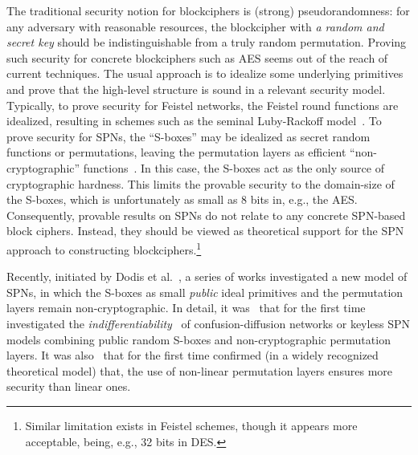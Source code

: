 


The traditional security notion for blockciphers is (strong) pseudorandomness: for any adversary with reasonable resources, the blockcipher with {\it a random and secret key} should be indistinguishable from a truly random
permutation. Proving such security for concrete blockciphers such as AES
seems out of the reach of current techniques. The usual approach is to idealize some underlying primitives and prove that the
high-level structure is sound in a relevant security model. Typically, to prove security for Feistel networks, the Feistel round functions are idealized, resulting in schemes such as the seminal Luby-Rackoff model~\cite{DBLP:journals/siamcomp/LubyR88,EC:MauPie03,C:patarin03,C:patarin04,C:HoaRog10,JC:CHKPST16}. To prove security for SPNs, the ``S-boxes'' may be idealized as secret random functions or permutations, leaving the permutation layers as efficient ``non-cryptographic'' functions~\cite{FSE:IwaKur00,miles2015substitution}. In this case, the S-boxes act as the only source of cryptographic hardness. This limits the provable security to the domain-size of the S-boxes, which is unfortunately as small as 8 bits in, e.g., the AES. Consequently, provable results on SPNs do not relate to any concrete SPN-based block ciphers. Instead, they should be viewed as theoretical support for the SPN approach to constructing blockciphers.\footnote{Similar limitation exists in Feistel schemes, though it appears more acceptable, being, e.g., 32 bits in DES.}


Recently, initiated by Dodis et al.~\cite{EC:DSSL16,EPRINT:DKSTZ17}, a series of works investigated a new model of SPNs, in which the S-boxes
as small {\it public} ideal primitives and the permutation layers remain non-cryptographic. In detail, it was~\cite{EC:DSSL16} that for the first time investigated the {\it indifferentiability}~\cite{TCC:MauRenHol04}
of confusion-diffusion networks or keyless SPN models  combining public random S-boxes and non-cryptographic permutation layers. It was also~\cite{EC:DSSL16} that for the first time confirmed (in a widely recognized theoretical model) that, the use of non-linear permutation layers ensures more security than linear ones.


